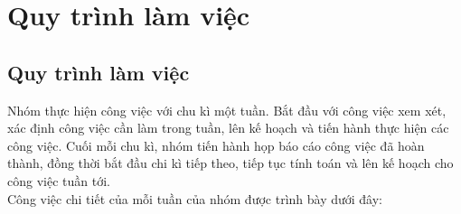 \section{Quy trình làm việc}

\subsection{Quy trình làm việc}
\hspace*{0.5cm} Nhóm thực hiện công việc với chu kì một tuần. Bắt đầu với công việc xem xét, xác định công việc cần làm trong tuần, lên kế hoạch và tiến hành thực hiện các công việc. Cuối mỗi chu kì, nhóm tiến hành họp báo cáo công việc đã hoàn thành, đồng thời bắt đầu chi kì tiếp theo, tiếp tục tính toán và lên kế hoạch cho công việc tuần tới.\\

Công việc chi tiết của mỗi tuần của nhóm được trình bày dưới đây:


